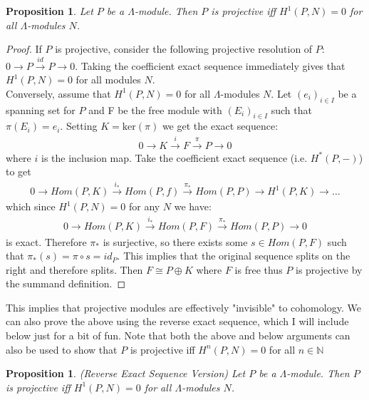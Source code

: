 \documentclass[12pt]{book}
\newtheorem{proposition}[theorem]{Proposition}
\theoremstyle{definition}
\begin{document}
\begin{proposition}
    Let $P$ be a $\Lambda$-module. Then $P$ is projective iff $H^1(P,N) = 0$ for all $\Lambda$-modules $N$.    
\end{proposition}
\begin{proof}
    If $P$ is projective, consider the following projective resolution of $P$: $0 \rightarrow P \xrightarrow{id} P \rightarrow 0$. Taking the coefficient exact sequence immediately gives that $H^1(P,N) = 0$ for all modules $N$. 
    \\Conversely, assume that $H^1(P,N) = 0$ for all $\Lambda$-modules $N$. Let $(e_i)_{i \in I}$ be a spanning set for $P$ and F be the free module with $(E_i)_{i \in I}$ such that $\pi(E_i) = e_i$. Setting $K = \text{ker}(\pi)$ we get the exact sequence: 
    \begin{align*}
        0 \rightarrow K \xrightarrow{i} F \xrightarrow{\pi} P \rightarrow 0
    \end{align*}
    where $i$ is the inclusion map. Take the coefficient exact sequence (i.e. $H^*(P, -)$) to get 
    \begin{align*}
        0 \rightarrow Hom(P,K) \xrightarrow{i_*} Hom(P,f) \xrightarrow{\pi_*} Hom(P,P) \rightarrow H^1(P,K) \rightarrow \dots 
    \end{align*}
    which since $H^1(P,N) = 0$ for any $N$ we have: 
    \begin{align*}
        0 \rightarrow Hom(P,K) \xrightarrow{i_*} Hom(P,F) \xrightarrow{\pi_*} Hom(P,P) \rightarrow 0
    \end{align*}
    is exact. Therefore $\pi_*$ is surjective, so there exists some $s \in Hom(P,F)$ such that $\pi_*(s) = \pi \circ s = id_P$. This implies that the original sequence splits on the right and therefore splits. Then $F \cong P \oplus K$ where $F$ is free thus $P$ is projective by the summand definition. 
\end{proof}

This implies that projective modules are effectively "invisible" to cohomology. We can also prove the above using the reverse exact sequence, which I will include below just for a bit of fun. Note that both the above and below arguments can also be used to show that $P$ is projective iff $H^n(P,N) = 0$ for all $n \in \mathbb{N}$

\begin{proposition}
    (Reverse Exact Sequence Version) Let $P$ be a $\Lambda$-module. Then $P$ is projective iff $H^1(P,N) = 0$ for all $\Lambda$-modules $N$.
\end{proposition}
\end{document}
